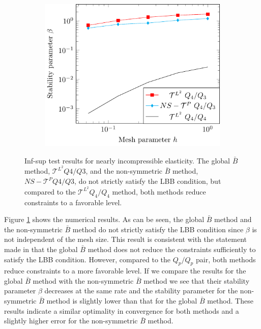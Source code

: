 \begin{figure}[htb!]
\begin{subfigure}[b]{0.31\linewidth}
    \end{subfigure}
    \begin{subfigure}[b]{0.31\linewidth}        %
        \centering
        \includegraphics[width=\linewidth]{beta_p_4}
    \end{subfigure}

    \caption{Inf-sup test results for nearly incompressible elasticity. The global $\bar{B}$ method, $\mathcal{T}^{L^2} Q4/Q3$, and the non-symmetric \Bezier $\bar{B}$ method, $NS - \mathcal{T}^P Q4/Q3$, do not strictly satisfy the LBB condition, but compared to the $\mathcal{T}^{L^2} Q_4/Q_4$ method, both methods reduce constraints to a favorable level. }
    \label{fig:inf_sup}
\end{figure}

Figure \ref{fig:inf_sup} shows the numerical results. As can be seen, the global $\bar{B}$ method and the non-symmetric \Bezier $\bar{B}$ method do not strictly satisfy the LBB condition since $\beta$ is not independent of the mesh size. This result is consistent with the statement made in \cite{elguedj:hal-00457010} that the global $\bar{B}$ method does not reduce the constraints sufficiently to satisfy the LBB condition. However, compared to the $Q_p/Q_p$ pair, both methods reduce constraints to a more favorable level. If we compare the results for the global $\bar{B}$ method with the non-symmetric \Bezier $\bar{B}$ method we see that their stability parameter $\beta$ decreases at the same rate and the stability parameter for the non-symmetric \Bezier $\bar{B}$ method is slightly lower than that for the global $\bar{B}$ method. These results indicate a similar optimality in convergence for both methods and a slightly higher error for the non-symmetric \Bezier $\bar{B}$ method.

